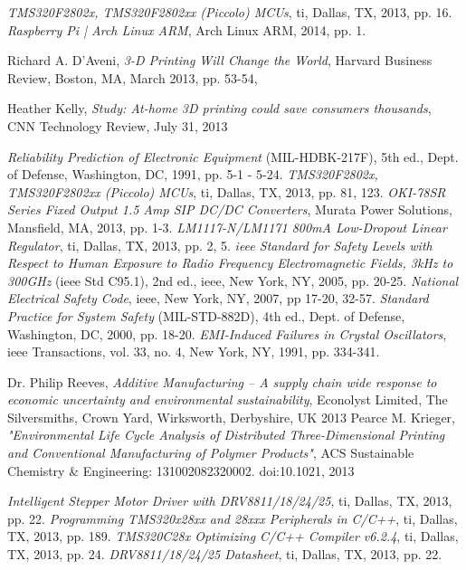 \begin{thebibliography}{9}
	\textit{TMS320F2802x, TMS320F2802xx (Piccolo) MCUs},
	\gls{ti}, Dallas, TX,
	2013, pp. 16.
	\textit{Raspberry Pi | Arch Linux ARM},
	Arch Linux ARM,
	2014, pp. 1.

	Richard A. D'Aveni,
	\textit{3-D Printing Will Change the World},
	Harvard Business Review, Boston, MA,
	March 2013, pp. 53-54,

	Heather Kelly,
	\textit{Study: At-home 3D printing could save consumers thousands},
	CNN Technology Review,
	July 31, 2013

	\textit{Reliability Prediction of Electronic Equipment} (MIL-HDBK-217F), 5th ed.,
	Dept. of Defense, Washington, DC,
	1991, pp. 5-1 - 5-24.
	\textit{TMS320F2802x, TMS320F2802xx (Piccolo) MCUs},
	\gls{ti}, Dallas, TX,
	2013, pp. 81, 123.
	\textit{OKI-78SR Series Fixed Output 1.5 Amp SIP DC/DC Converters},
	Murata Power Solutions, Mansfield, MA,
	2013, pp. 1-3.
	\textit{LM1117-N/LM1171 800mA Low-Dropout Linear Regulator},
	\gls{ti}, Dallas, TX,
	2013, pp. 2, 5.
	\textit{\gls{ieee} Standard for Safety Levels with Respect to Human Exposure to Radio Frequency Electromagnetic Fields, 3kHz to 300GHz} (\gls{ieee} Std C95.1), 2nd ed.,
	\gls{ieee}, New York, NY,
	2005, pp. 20-25.
	\textit{National Electrical Safety Code},
	\gls{ieee}, New York, NY,
	2007, pp 17-20, 32-57.
	\textit{Standard Practice for System Safety} (MIL-STD-882D), 4th ed.,
	Dept. of Defense, Washington, DC,
	2000, pp. 18-20.
	\textit{EMI-Induced Failures in Crystal Oscillators},
	\gls{ieee} Transactions, vol. 33, no. 4, New York, NY,
	1991, pp. 334-341.

	Dr. Philip Reeves,
	\textit{Additive Manufacturing – A supply chain wide response to economic uncertainty and environmental sustainability},
	Econolyst Limited, The Silversmiths, Crown Yard, Wirksworth, Derbyshire, UK
	2013
	Pearce M. Krieger,
	\textit{"Environmental Life Cycle Analysis of Distributed Three-Dimensional Printing and Conventional Manufacturing of Polymer Products"},
	ACS Sustainable Chemistry \& Engineering: 131002082320002. doi:10.1021,
	2013	

	\textit{Intelligent Stepper Motor Driver with DRV8811/18/24/25},
	\gls{ti}, Dallas, TX,
	2013, pp. 22.
	\textit{Programming TMS320x28xx and 28xxx Peripherals in C/C++},
	\gls{ti}, Dallas, TX,
	2013, pp. 189.
	\textit{TMS320C28x Optimizing C/C++ Compiler v6.2.4},
	\gls{ti}, Dallas, TX,
	2013, pp. 24.
	\textit{DRV8811/18/24/25 Datasheet},
	\gls{ti}, Dallas, TX,
	2013, pp. 22.
\end{thebibliography}
